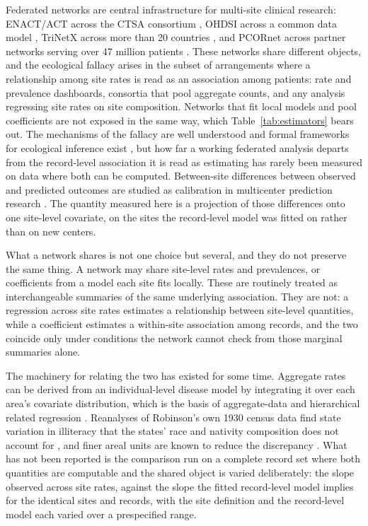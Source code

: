 \documentclass[11pt]{article}
\begin{document}
Federated networks are central infrastructure for multi-site clinical
research: ENACT/ACT across the CTSA consortium
\cite{visweswaran2018act}, OHDSI across a common data model
\cite{hripcsak2015ohdsi}, TriNetX across more than 20 countries
\cite{trinetx2024}, and PCORnet across partner networks serving over
47 million patients \cite{fleurence2014pcornet}.  These networks share
different objects, and the ecological fallacy
\cite{robinson1950ecological} arises in the subset of arrangements
where a relationship among site rates is read as an association among
patients: rate and prevalence dashboards, consortia that pool aggregate
counts, and any analysis regressing site rates on site composition.
Networks that fit local models and pool coefficients are not exposed in
the same way, which Table~\ref{tab:estimators} bears out.  The
mechanisms of the fallacy are
well understood \cite{greenland1992ecological,greenland2001ecologic}
and formal frameworks for ecological inference exist
\cite{king1997ecological,wakefield2003ecological,wakefield2008ecologic},
but how far a working federated analysis departs from the
record-level association it is read as estimating has rarely been
measured on data where both can be computed.  Between-site differences
between observed and predicted outcomes are studied as calibration in
multicenter prediction research
\cite{vancalster2019calibration,wynants2018clustering}.  The quantity
measured here is a projection of those differences onto one site-level
covariate, on the sites the record-level model was fitted on rather
than on new centers.

What a network shares is not one choice but several, and they do not
preserve the same thing.  A network may share site-level rates and
prevalences, or coefficients from a model each site fits locally.  These are
routinely treated as interchangeable summaries of the same underlying
association.  They are not: a regression across site rates estimates a
relationship between site-level quantities, while a coefficient
estimates a within-site association among records, and the two coincide
only under conditions the network cannot check from those marginal
summaries alone.

The machinery for relating the two has existed for some time.  Aggregate
rates can be derived from an individual-level disease model by
integrating it over each area's covariate distribution, which is the
basis of aggregate-data and hierarchical related regression
\cite{wakefield2008twophase,jackson2008hierarchical,prentice1995aggregate}.
Reanalyses of Robinson's own 1930 census data find state variation in
illiteracy that the states' race and nativity composition does not
account for \cite{subramanian2009revisiting}, and finer areal units are
known to reduce the discrepancy \cite{best2001ecological,lancaster2006reducing}.
What has not been reported is the comparison run on a complete record
set where both quantities are computable and the shared object is varied
deliberately: the slope observed across site rates, against the slope the
fitted record-level model implies for the identical sites and records,
with the site definition and the record-level model each varied over a
prespecified range.
\end{document}
